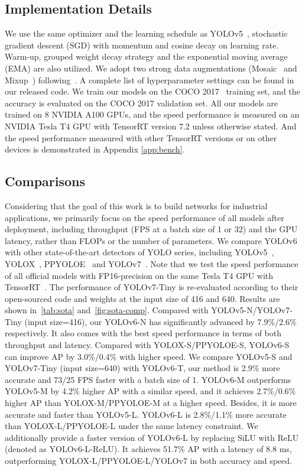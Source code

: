 \documentclass[10pt,twocolumn,letterpaper]{article}
\begin{document}
\subsection{Implementation Details}
We use the same optimizer and the learning schedule as YOLOv5~\cite{yolov5}, \ie stochastic gradient descent (SGD) with momentum and cosine decay on learning rate. Warm-up, grouped weight decay strategy and the exponential moving average (EMA) are also utilized. We adopt two strong data augmentations (Mosaic~\cite{bochkovskiy2020yolov4, yolov5} and Mixup~\cite{zhang2017mixup}) following~\cite{bochkovskiy2020yolov4,yolov5,ge2021yolox}. A complete list of hyperparameter settings can be found in our released code. We train our models on the COCO 2017~\cite{lin2014microsoft} training set, and the accuracy is evaluated on the COCO 2017 validation set. All our models are trained on 8 NVIDIA A100 GPUs, and the speed performance is measured on an NVIDIA Tesla T4 GPU with TensorRT version 7.2 unless otherwise stated. And the speed performance measured with other TensorRT versions or on other devices is demonstrated in Appendix \ref{app:bench}.

\subsection{Comparisons}
  Considering that the goal of this work is to build networks for industrial applications, we primarily focus on the speed performance of all models after deployment, including throughput (FPS at a batch size of 1 or 32) and the GPU latency, rather than FLOPs or the number of parameters. We compare YOLOv6 with other state-of-the-art detectors of YOLO series, including YOLOv5~\cite{yolov5}, YOLOX~\cite{ge2021yolox}, PPYOLOE~\cite{xu2022ppyoloe} and YOLOv7~\cite{wang2022yolov7}. Note that we test the speed performance of all official models with FP16-precision on the same Tesla T4 GPU with TensorRT~\cite{tensorrt}. The performance of YOLOv7-Tiny is re-evaluated according to their open-sourced code and weights at the input size of 416 and 640. Results are shown in~\cref{tab:sota} and~\cref{fig:sota-comp}. Compared with YOLOv5-N/YOLOv7-Tiny (input size=416), our YOLOv6-N has significantly advanced by 7.9\%/2.6\% respectively. It also comes with the best speed performance in terms of both throughput and latency. Compared with YOLOX-S/PPYOLOE-S, YOLOv6-S can improve AP by 3.0\%/0.4\% with higher speed. We compare YOLOv5-S and YOLOv7-Tiny (input size=640) with YOLOv6-T, our method is 2.9\% more accurate and 73/25 FPS faster with a batch size of 1. YOLOv6-M outperforms YOLOv5-M by 4.2\% higher AP with a similar speed, and it achieves 2.7\%/0.6\% higher AP than YOLOX-M/PPYOLOE-M at a higher speed. Besides, it is more accurate and faster than YOLOv5-L.  YOLOv6-L is 2.8\%/1.1\% more accurate than YOLOX-L/PPYOLOE-L under the same latency constraint. We additionally provide a faster version of YOLOv6-L by replacing SiLU with ReLU (denoted as YOLOv6-L-ReLU). It achieves 51.7\% AP with a latency of 8.8 ms, outperforming YOLOX-L/PPYOLOE-L/YOLOv7 in both accuracy and speed.
    
\end{document}
